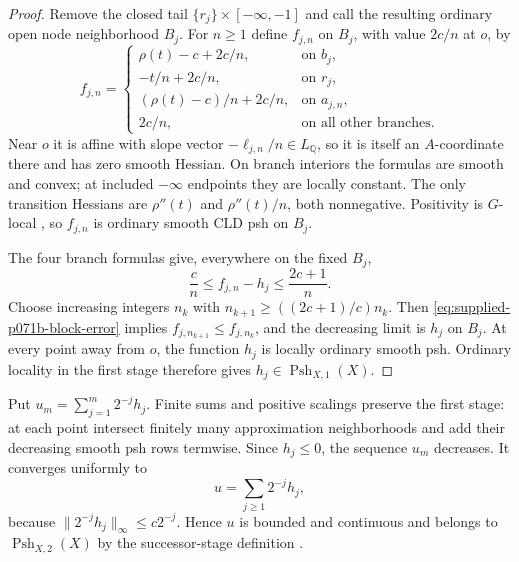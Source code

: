 \begin{proof}
Remove the closed tail $\{r_j\}\times[-\infty,-1]$ and call the resulting ordinary open node neighborhood $B_j$. For $n\geq1$ define $f_{j,n}$ on $B_j$, with value $2c/n$ at $o$, by
\[
 f_{j,n}=\begin{cases}
 \rho(t)-c+2c/n,&\text{on }b_j,\\
 -t/n+2c/n,&\text{on }r_j,\\
 (\rho(t)-c)/n+2c/n,&\text{on }a_{j,n},\\
 2c/n,&\text{on all other branches.}
 \end{cases}
\]
Near $o$ it is affine with slope vector $-\ell_{j,n}/n\in L_{\mathbb Q}$, so it is itself an $A$-coordinate there and has zero smooth Hessian. On branch interiors the formulas are smooth and convex; at included $-\infty$ endpoints they are locally constant. The only transition Hessians are $\rho''(t)$ and $\rho''(t)/n$, both nonnegative. Positivity is $G$-local \cite[Definition~3.5.1]{CLD25}, so $f_{j,n}$ is ordinary smooth CLD psh on $B_j$.

The four branch formulas give, everywhere on the fixed $B_j$,
\begin{equation}\label{eq:supplied-p071b-block-error}
 \frac cn\leq f_{j,n}-h_j\leq\frac{2c+1}{n}.
\end{equation}
Choose increasing integers $n_k$ with $n_{k+1}\geq((2c+1)/c)n_k$. Then \eqref{eq:supplied-p071b-block-error} implies $f_{j,n_{k+1}}\leq f_{j,n_k}$, and the decreasing limit is $h_j$ on $B_j$. At every point away from $o$, the function $h_j$ is locally ordinary smooth psh. Ordinary locality in the first stage therefore gives $h_j\in\operatorname{Psh}_{X,1}(X)$.
\end{proof}

Put $u_m=\sum_{j=1}^{m}2^{-j}h_j$. Finite sums and positive scalings preserve the first stage: at each point intersect finitely many approximation neighborhoods and add their decreasing smooth psh rows termwise. Since $h_j\leq0$, the sequence $u_m$ decreases. It converges uniformly to
\begin{equation}\label{eq:supplied-p071b-witness}
 u=\sum_{j\geq1}2^{-j}h_j,
\end{equation}
because $\|2^{-j}h_j\|_\infty\leq c2^{-j}$. Hence $u$ is bounded and continuous and belongs to $\operatorname{Psh}_{X,2}(X)$ by the successor-stage definition \cite[Definition~8.1.1]{CLD25}.

